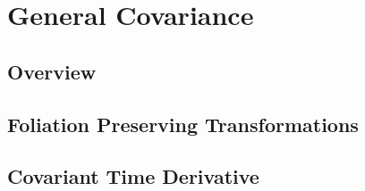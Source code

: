 \chapter{General Covariance}\label{generalcovariance}
\section{Overview}
\section{Foliation Preserving Transformations}
\section{Covariant Time Derivative}

